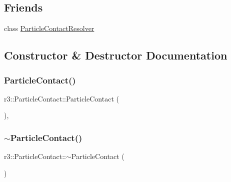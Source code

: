 \subsection*{Friends}
\begin{DoxyCompactItemize}
\item 
class \mbox{\hyperlink{classr3_1_1_particle_contact_ab2e3f4c3dc9b46966c6ec90e0fe88b6c}{Particle\+Contact\+Resolver}}
\end{DoxyCompactItemize}


\subsection{Constructor \& Destructor Documentation}
\mbox{\label{classr3_1_1_particle_contact_a57d3527a606d63a48816aae93d403eee}} 
\subsubsection{\texorpdfstring{Particle\+Contact()}{ParticleContact()}}
{\footnotesize\ttfamily r3\+::\+Particle\+Contact\+::\+Particle\+Contact (\begin{DoxyParamCaption}{ }\end{DoxyParamCaption})\hspace{0.3cm}{\ttfamily [explicit]}, {\ttfamily [default]}}

\mbox{\label{classr3_1_1_particle_contact_ab6524a4421fd38a282fecaf013d053a2}} 
\subsubsection{\texorpdfstring{$\sim$\+Particle\+Contact()}{~ParticleContact()}}
{\footnotesize\ttfamily r3\+::\+Particle\+Contact\+::$\sim$\+Particle\+Contact (\begin{DoxyParamCaption}{ }\end{DoxyParamCaption})\hspace{0.3cm}{\ttfamily [default]}}



